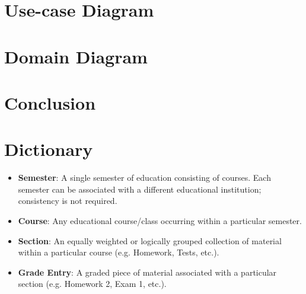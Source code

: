 \documentclass[12pt]{article}
\begin{document}
\section{Use-case Diagram}

\section{Domain Diagram}

\section{Conclusion}

\section{Dictionary}
\begin{itemize}
    \item \textbf{Semester}: A single semester of education consisting of courses. Each semester can
    be associated with a different educational institution; consistency is not required.
    \item \textbf{Course}: Any educational course/class occurring within a particular semester.
    \item \textbf{Section}: An equally weighted or logically grouped collection of material within a
    particular course (e.g. Homework, Tests, etc.).
    \item \textbf{Grade Entry}: A graded piece of material associated with a particular section 
    (e.g. Homework 2, Exam 1, etc.).
\end{itemize}
\end{document}

